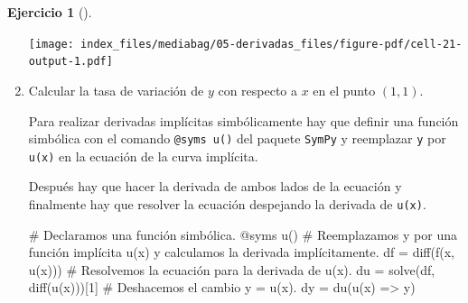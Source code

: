 \documentclass[
  a4paper,
]{scrreport}
\newenvironment{Shaded}{\begin{snugshade}}{\end{snugshade}}
\newcommand{\CommentTok}[1]{\textcolor[rgb]{0.37,0.37,0.37}{#1}}
\newcommand{\FloatTok}[1]{\textcolor[rgb]{0.68,0.00,0.00}{#1}}
\newcommand{\FunctionTok}[1]{\textcolor[rgb]{0.28,0.35,0.67}{#1}}
\newcommand{\NormalTok}[1]{\textcolor[rgb]{0.00,0.23,0.31}{#1}}
\newcommand{\OperatorTok}[1]{\textcolor[rgb]{0.37,0.37,0.37}{#1}}
\newcommand{\PreprocessorTok}[1]{\textcolor[rgb]{0.68,0.00,0.00}{#1}}
\theoremstyle{definition}
\newtheorem{exercise}{Ejercicio}[chapter]
\theoremstyle{remark}
\begin{document}
\begin{exercise}[]
\begin{enumerate}
\begin{tcolorbox}
  \texttt{[image: index\_files/mediabag/05-derivadas\_files/figure-pdf/cell-21-output-1.pdf]}

  \end{tcolorbox}
\item
  Calcular la tasa de variación de \(y\) con respecto a \(x\) en el
  punto \((1,1)\).

  \begin{tcolorbox}[enhanced jigsaw, opacitybacktitle=0.6, bottomrule=.15mm, opacityback=0, colback=white, left=2mm, coltitle=black, rightrule=.15mm, breakable, bottomtitle=1mm, leftrule=.75mm, title=\textcolor{quarto-callout-note-color}{\faInfo}\hspace{0.5em}{Ayuda}, titlerule=0mm, toptitle=1mm, colbacktitle=quarto-callout-note-color!10!white, colframe=quarto-callout-note-color-frame, toprule=.15mm, arc=.35mm]

  Para realizar derivadas implícitas simbólicamente hay que definir una
  función simbólica con el comando \texttt{@syms\ u()} del paquete
  \texttt{SymPy} y reemplazar \texttt{y} por \texttt{u(x)} en la
  ecuación de la curva implícita.

  Después hay que hacer la derivada de ambos lados de la ecuación y
  finalmente hay que resolver la ecuación despejando la derivada de
  \texttt{u(x)}.

  \end{tcolorbox}

  \begin{tcolorbox}[enhanced jigsaw, opacitybacktitle=0.6, bottomrule=.15mm, opacityback=0, colback=white, left=2mm, coltitle=black, rightrule=.15mm, breakable, bottomtitle=1mm, leftrule=.75mm, title=\textcolor{quarto-callout-tip-color}{\faLightbulb}\hspace{0.5em}{Solución}, titlerule=0mm, toptitle=1mm, colbacktitle=quarto-callout-tip-color!10!white, colframe=quarto-callout-tip-color-frame, toprule=.15mm, arc=.35mm]

\begin{Shaded}
\begin{Highlighting}[]
\CommentTok{\# Declaramos una función simbólica.}
\PreprocessorTok{@syms} \FunctionTok{u}\NormalTok{()}
\CommentTok{\# Reemplazamos y por una función implícita u(x) y calculamos la derivada implícitamente.}
\NormalTok{df }\OperatorTok{=} \FunctionTok{diff}\NormalTok{(}\FunctionTok{f}\NormalTok{(x, }\FunctionTok{u}\NormalTok{(x)))}
\CommentTok{\# Resolvemos la ecuación para la derivada de u(x).}
\NormalTok{du }\OperatorTok{=} \FunctionTok{solve}\NormalTok{(df, }\FunctionTok{diff}\NormalTok{(}\FunctionTok{u}\NormalTok{(x)))[}\FloatTok{1}\NormalTok{]}
\CommentTok{\# Deshacemos el cambio y = u(x).}
\NormalTok{dy }\OperatorTok{=} \FunctionTok{du}\NormalTok{(}\FunctionTok{u}\NormalTok{(x) }\OperatorTok{=\textgreater{}}\NormalTok{ y)}
\end{Highlighting}
\end{Shaded}


\end{tcolorbox}
\end{enumerate}
\end{exercise}
\end{document}
